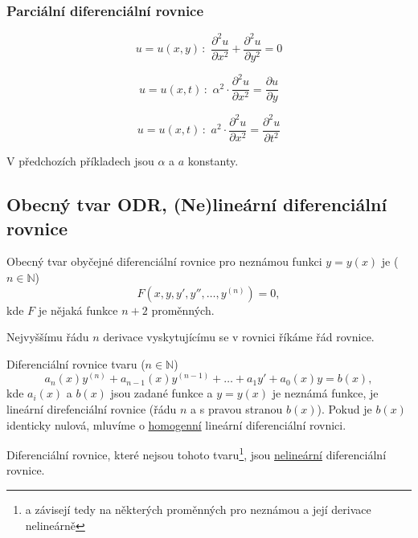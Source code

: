 \documentclass[../main.tex]{subfiles}
\begin{document}
\subsubsection{Parciální diferenciální rovnice}

\begin{example}
    \[ u = u(x,y)\, : \,\, \frac{\partial^2 u}{\partial x^2} + \frac{\partial^2 u}{\partial y^2} = 0 \]
\end{example}

\begin{example}
    \[ u = u(x,t)\, : \,\, \alpha^2 \cdot \frac{\partial^2 u}{\partial x^2} = \frac{\partial u}{\partial y} \]
\end{example}

\begin{example}
    \[ u = u(x,t)\, : \,\, a^2\cdot \frac{\partial^2 u}{\partial x^2} = \frac{\partial^2 u}{\partial t^2} \]
\end{example}

\noindent
V předchozích příkladech jsou $\alpha$ a $a$ konstanty.

\subsection{Obecný tvar ODR, (Ne)lineární diferenciální rovnice}

\begin{definition}
    Obecný tvar obyčejné diferenciální rovnice pro neznámou funkci $y = y(x)$ je ($n \in \mathbb{N}$)
    \[ F(x, y, y', y'', \dots, y^{(n)}) = 0, \]
    kde $F$ je nějaká funkce $n+2$ proměnných.
\end{definition}

\begin{definition}
    Nejvyššímu řádu $n$ derivace vyskytujícímu se v rovnici říkáme řád rovnice.
\end{definition}

\begin{definition}
    Diferenciální rovnice tvaru ($n \in \mathbb{N}$)
    \[ a_n(x)y^{(n)} + a_{n-1}(x)y^{(n-1)} + \dots + a_1y' + a_0(x)y = b(x), \]
    kde $a_i(x)$ a $b(x)$ jsou zadané funkce a $y = y(x)$ je neznámá funkce, je
    lineární direfenciální rovnice (řádu $n$ a s pravou stranou $b(x)$).
    Pokud je $b(x)$ identicky nulová, mluvíme o \underline{homogenní} lineární diferenciální rovnici.

    \vspace{3mm}
    \noindent
    Diferenciální rovnice, které nejsou tohoto tvaru\footnote{a závisejí tedy na některých proměnných pro neznámou a její derivace nelineárně},
    jsou \underline{nelineární} diferenciální rovnice.
\end{definition}
\end{document}
